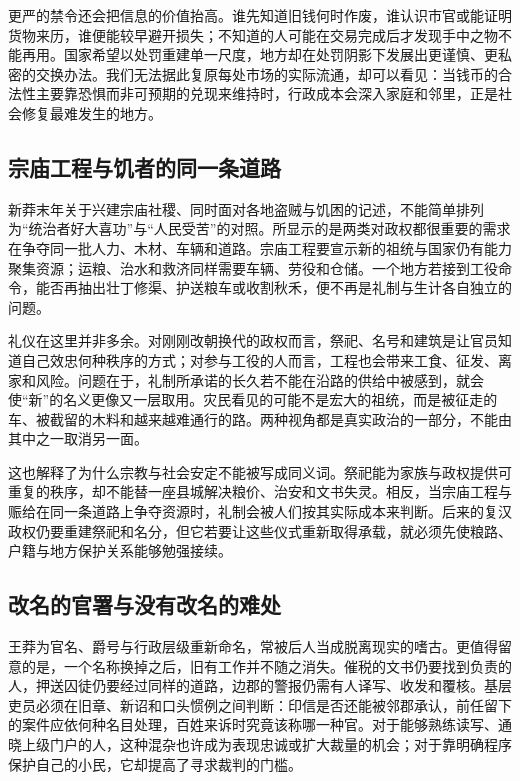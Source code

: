 更严的禁令还会把信息的价值抬高。谁先知道旧钱何时作废，谁认识市官或能证明货物来历，谁便能较早避开损失；不知道的人可能在交易完成后才发现手中之物不能再用。国家希望以处罚重建单一尺度，地方却在处罚阴影下发展出更谨慎、更私密的交换办法。我们无法据此复原每处市场的实际流通，却可以看见：当钱币的合法性主要靠恐惧而非可预期的兑现来维持时，行政成本会深入家庭和邻里，正是社会修复最难发生的地方。

\subsection{宗庙工程与饥者的同一条道路}

新莽末年关于兴建宗庙社稷、同时面对各地盗贼与饥困的记述，不能简单排列为“统治者好大喜功”与“人民受苦”的对照。所显示的是两类对政权都很重要的需求在争夺同一批人力、木材、车辆和道路。宗庙工程要宣示新的祖统与国家仍有能力聚集资源；运粮、治水和救济同样需要车辆、劳役和仓储。一个地方若接到工役命令，能否再抽出壮丁修渠、护送粮车或收割秋禾，便不再是礼制与生计各自独立的问题。

礼仪在这里并非多余。对刚刚改朝换代的政权而言，祭祀、名号和建筑是让官员知道自己效忠何种秩序的方式；对参与工役的人而言，工程也会带来工食、征发、离家和风险。问题在于，礼制所承诺的长久若不能在沿路的供给中被感到，就会使“新”的名义更像又一层取用。灾民看见的可能不是宏大的祖统，而是被征走的车、被截留的木料和越来越难通行的路。两种视角都是真实政治的一部分，不能由其中之一取消另一面。

这也解释了为什么宗教与社会安定不能被写成同义词。祭祀能为家族与政权提供可重复的秩序，却不能替一座县城解决粮价、治安和文书失灵。相反，当宗庙工程与赈给在同一条道路上争夺资源时，礼制会被人们按其实际成本来判断。后来的复汉政权仍要重建祭祀和名分，但它若要让这些仪式重新取得承载，就必须先使粮路、户籍与地方保护关系能够勉强接续。

\subsection{改名的官署与没有改名的难处}

王莽为官名、爵号与行政层级重新命名，常被后人当成脱离现实的嗜古。更值得留意的是，一个名称换掉之后，旧有工作并不随之消失。催税的文书仍要找到负责的人，押送囚徒仍要经过同样的道路，边郡的警报仍需有人译写、收发和覆核。基层吏员必须在旧章、新诏和口头惯例之间判断：印信是否还能被邻郡承认，前任留下的案件应依何种名目处理，百姓来诉时究竟该称哪一种官。对于能够熟练读写、通晓上级门户的人，这种混杂也许成为表现忠诚或扩大裁量的机会；对于靠明确程序保护自己的小民，它却提高了寻求裁判的门槛。

